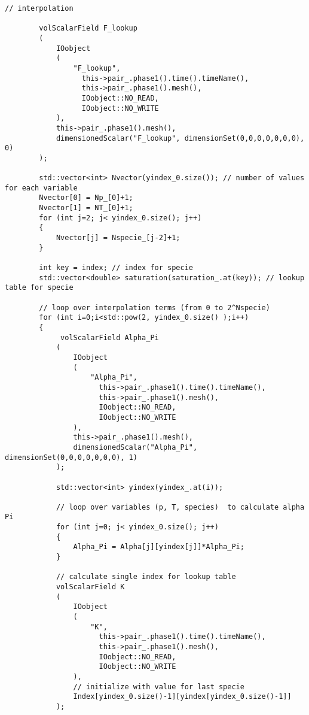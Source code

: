 \documentclass[a4paper, 12 pt, fleqn]{article}
\begin{document}
\begin{lstlisting}[gobble=7]
        // interpolation

        volScalarField F_lookup
        (
            IOobject
            (
                "F_lookup",
	              this->pair_.phase1().time().timeName(),
	              this->pair_.phase1().mesh(),
	              IOobject::NO_READ,
	              IOobject::NO_WRITE
            ),
            this->pair_.phase1().mesh(),
            dimensionedScalar("F_lookup", dimensionSet(0,0,0,0,0,0,0), 0)
        );

        std::vector<int> Nvector(yindex_0.size()); // number of values for each variable
        Nvector[0] = Np_[0]+1;
        Nvector[1] = NT_[0]+1;
        for (int j=2; j< yindex_0.size(); j++)
        {
            Nvector[j] = Nspecie_[j-2]+1;
        }

        int key = index; // index for specie
        std::vector<double> saturation(saturation_.at(key)); // lookup table for specie     

        // loop over interpolation terms (from 0 to 2^Nspecie)
        for (int i=0;i<std::pow(2, yindex_0.size() );i++)
        {
             volScalarField Alpha_Pi
            (
                IOobject
                (
                    "Alpha_Pi",
	                  this->pair_.phase1().time().timeName(),
	                  this->pair_.phase1().mesh(),
	                  IOobject::NO_READ,
	                  IOobject::NO_WRITE
                ),
                this->pair_.phase1().mesh(),
                dimensionedScalar("Alpha_Pi", dimensionSet(0,0,0,0,0,0,0), 1)
            );

            std::vector<int> yindex(yindex_.at(i)); 

            // loop over variables (p, T, species)  to calculate alpha Pi
            for (int j=0; j< yindex_0.size(); j++)
            {    
                Alpha_Pi = Alpha[j][yindex[j]]*Alpha_Pi;               
            } 

            // calculate single index for lookup table
            volScalarField K
            (
                IOobject
                (
                    "K",
	                  this->pair_.phase1().time().timeName(),
	                  this->pair_.phase1().mesh(),
	                  IOobject::NO_READ,
	                  IOobject::NO_WRITE
                ),
                // initialize with value for last specie
                Index[yindex_0.size()-1][yindex[yindex_0.size()-1]] 
            );


\end{lstlisting}
\end{document}
